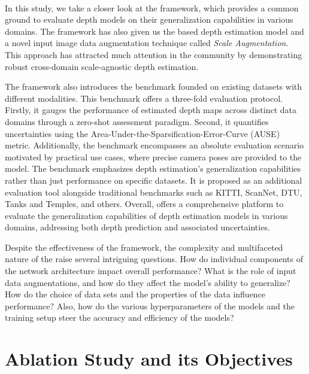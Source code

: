     \paragraph{}In this study, we take a closer look at the {\framework} framework\cite{schroeppel2022benchmark}, which provides a common ground to evaluate {\mv} depth models on their generalization capabilities in various domains. The framework has also given us the {\dispn} based {\rmvd} depth estimation model and a novel input image data augmentation technique called \textit{Scale Augmentation}\cite{schroeppel2022benchmark}. This approach has attracted much attention in the community by demonstrating robust cross-domain scale-agnostic {\mv} depth estimation.\par
    The framework also introduces the {\framework} benchmark \cite{schroeppel2022benchmark} founded on existing datasets with different modalities. This benchmark offers a three-fold evaluation protocol. Firstly, it gauges the performance of estimated depth maps across distinct data domains through a zero-shot assessment paradigm. Second, it quantifies uncertainties using the Area-Under-the-Sparsification-Error-Curve (AUSE)\cite{Ilg2018} metric. Additionally, the benchmark encompasses an absolute evaluation scenario motivated by practical use cases, where precise camera poses are provided to the model. The benchmark emphasizes depth estimation's generalization capabilities rather than just performance on specific datasets. It is proposed as an additional evaluation tool alongside traditional benchmarks such as KITTI, ScanNet, DTU, Tanks and Temples, and others. Overall, {\framework} offers a comprehensive platform to evaluate the generalization capabilities of depth estimation models in various domains, addressing both depth prediction and associated uncertainties.\par
    Despite the effectiveness of the {\rmvd} framework, the complexity and multifaceted nature of the {\mvs} raise several intriguing questions. How do individual components of the network architecture impact overall performance? What is the role of input data augmentations, and how do they affect the model's ability to generalize? How do the choice of data sets and the properties of the data influence performance? Also, how do the various hyperparameters of the models and the training setup steer the accuracy and efficiency of the models? \par

\section{Ablation Study and its Objectives}\label{sec:Ablation study and its objectives}
